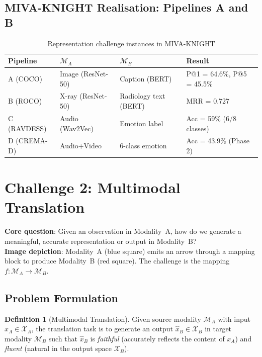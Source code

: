 \documentclass[12pt,a4paper]{article}
\theoremstyle{definition}
\newtheorem{definition}{Definition}[section]
\theoremstyle{plain}
\theoremstyle{remark}
\newcommand{\MA}{\mathcal{M}_A}
\newcommand{\MB}{\mathcal{M}_B}
\begin{document}
\subsection{MIVA-KNIGHT Realisation: Pipelines A and B}

\begin{table}[H]
\centering
\caption{Representation challenge instances in MIVA-KNIGHT}
\begin{tabular}{llll}
\toprule
\textbf{Pipeline} & $\MA$ & $\MB$ & \textbf{Result} \\
\midrule
A (COCO) & Image (ResNet-50) & Caption (BERT) & P@1 = 64.6\%, P@5 = 45.5\% \\
B (ROCO) & X-ray (ResNet-50) & Radiology text (BERT) & MRR = 0.727 \\
C (RAVDESS) & Audio (Wav2Vec) & Emotion label & Acc = 59\% (6/8 classes) \\
D (CREMA-D) & Audio+Video & 6-class emotion & Acc = 43.9\% (Phase 2) \\
\bottomrule
\end{tabular}
\end{table}

\newpage
\section{Challenge 2: Multimodal Translation}
\label{sec:trans}

\begin{tcolorbox}[challengebox,title={Challenge 2: Translation}]
\textbf{Core question}: Given an observation in Modality~A, how do we generate a meaningful, accurate representation or output in Modality~B?\\[4pt]
\textbf{Image depiction}: Modality~A (blue square) emits an arrow through a mapping block to produce Modality~B (red square). The challenge is the mapping $f: \MA \to \MB$.
\end{tcolorbox}

\subsection{Problem Formulation}

\begin{definition}[Multimodal Translation]
Given source modality $\MA$ with input $x_A \in \mathcal{X}_A$, the translation task is to generate an output $\hat{x}_B \in \mathcal{X}_B$ in target modality $\MB$ such that $\hat{x}_B$ is \emph{faithful} (accurately reflects the content of $x_A$) and \emph{fluent} (natural in the output space $\mathcal{X}_B$).
\end{definition}
\end{document}
